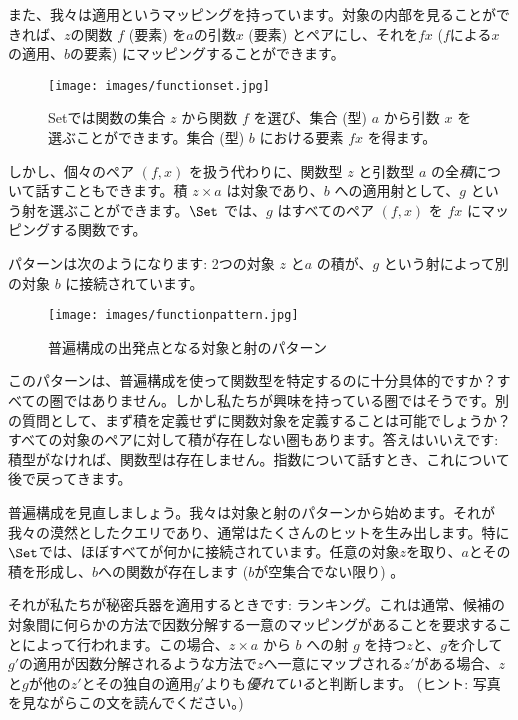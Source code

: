 また、我々は適用というマッピングを持っています。対象の内部を見ることができれば、$z$の関数 $f$ (要素) を$a$の引数$x$ (要素) とペアにし、それを$f x$ ($f$による$x$の適用、$b$の要素) にマッピングすることができます。

\begin{figure}[H]
  \centering\texttt{[image: images/functionset.jpg]}
  \caption{Setでは関数の集合 $z$ から関数 $f$ を選び、集合 (型) $a$ から引数 $x$ を選ぶことができます。集合 (型) $b$ における要素 $f x$ を得ます。}
\end{figure}

\noindent
しかし、個々のペア $(f, x)$ を扱う代わりに、関数型 $z$ と引数型 $a$ の全\emph{積}について話すこともできます。積 $z\times{}a$ は対象であり、$b$ への適用射として、$g$ という射を選ぶことができます。$\Set$ では、$g$ はすべてのペア $(f, x)$ を $f x$ にマッピングする関数です。

パターンは次のようになります: 2つの対象 $z$ と$a$ の積が、$g$ という射によって別の対象 $b$ に接続されています。

\begin{figure}[H]
  \centering
  \texttt{[image: images/functionpattern.jpg]}
  \caption{普遍構成の出発点となる対象と射のパターン}
\end{figure}

\noindent
このパターンは、普遍構成を使って関数型を特定するのに十分具体的ですか？すべての圏ではありません。しかし私たちが興味を持っている圏ではそうです。別の質問として、まず積を定義せずに関数対象を定義することは可能でしょうか？すべての対象のペアに対して積が存在しない圏もあります。答えはいいえです: 積型がなければ、関数型は存在しません。指数について話すとき、これについて後で戻ってきます。

普遍構成を見直しましょう。我々は対象と射のパターンから始めます。それが我々の漠然としたクエリであり、通常はたくさんのヒットを生み出します。特に$\Set$では、ほぼすべてが何かに接続されています。任意の対象$z$を取り、$a$とその積を形成し、$b$への関数が存在します ($b$が空集合でない限り) 。

それが私たちが秘密兵器を適用するときです: ランキング。これは通常、候補の対象間に何らかの方法で因数分解する一意のマッピングがあることを要求することによって行われます。この場合、$z \times a$ から $b$ への射 $g$ を持つ$z$と、$g$を介して$g'$の適用が因数分解されるような方法で$z$へ一意にマップされる$z'$がある場合、$z$と$g$が他の$z'$とその独自の適用$g'$よりも\emph{優れている}と判断します。  (ヒント: 写真を見ながらこの文を読んでください。) 

